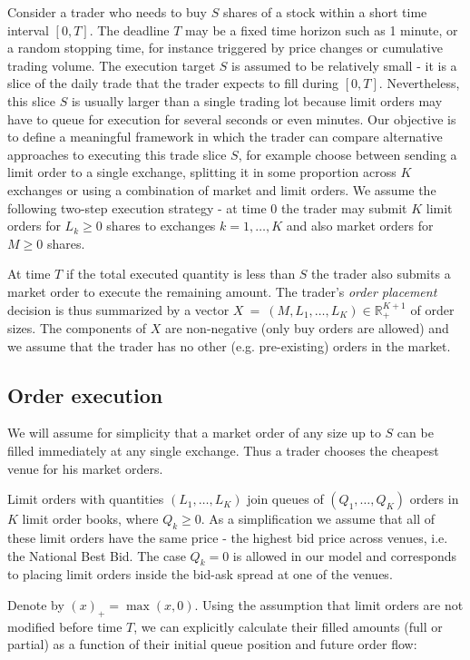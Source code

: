 \documentclass[opre,nonblindrev]{informs3}
\begin{document}
Consider a trader who needs to buy $S$ shares of a stock within a short time interval $[0,T]$. The deadline $T$ may be a fixed time horizon such as 1 minute, or a random stopping time, for instance triggered by price changes or cumulative trading volume. The execution target $S$ is assumed to be relatively small - it is a slice of the daily trade that the trader expects to fill during $[0,T]$. Nevertheless, this slice $S$ is usually larger than a single trading lot because limit orders may have to queue for execution for several seconds or even minutes. Our objective is to define a meaningful framework in which the trader can compare alternative approaches to executing this trade slice $S$, for example choose between sending a limit order to a single exchange, splitting it in some proportion across $K$ exchanges or using a combination of market and limit orders. We assume the following two-step execution strategy - at time 0 the trader may submit $K$ limit orders for $L_k\geq 0$ shares to exchanges $k=1,\dots,K$ and also market orders for $M\geq 0$ shares. 

At time $T$ if the total executed quantity is less than $S$ the trader also submits a market order to execute the remaining amount. The trader's {\it order placement} decision  is thus  summarized by a vector $X~=~(M,L_1,\dots,L_K)\in\mathbb{R}^{K+1}_+$ of order sizes. The components of $X$ are non-negative (only buy orders are allowed) and we assume that the trader has no other (e.g. pre-existing) orders in the market. 


\subsection{Order execution}

We will assume for simplicity that a market order of any size up to $S$ can be filled immediately at any single exchange. Thus a trader chooses the cheapest venue for his market orders.

Limit orders with quantities $(L_1,\dots,L_K)$ join queues of $(Q_1,\dots,Q_K)$ orders in $K$ limit order books, where $Q_k\geq 0$. As a simplification we assume that all of these limit orders have the same price - the highest bid price across venues, i.e. the National Best Bid. The case $Q_k=0$ is allowed in our model and corresponds to placing limit orders inside the bid-ask spread at one of the venues.

Denote by $(x)_+=\max(x,0)$. Using the assumption that limit orders are not modified before time $T$, we can explicitly calculate their filled amounts (full or partial) as a function of their initial queue position and future order flow:
\end{document}
